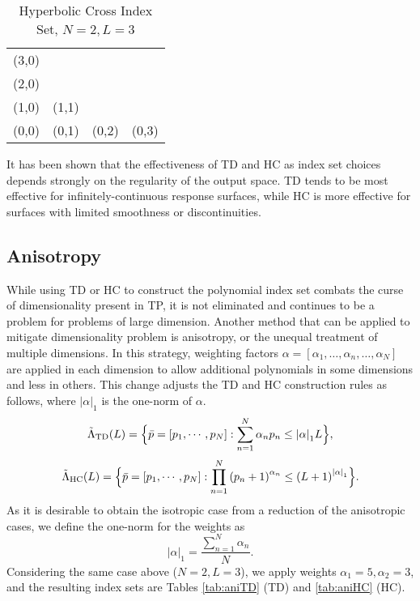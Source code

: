 \begin{table}[h]
  \centering
  \begin{tabular}{c c c c}
    (3,0) &       &       &       \\
    (2,0) &       &       &       \\
    (1,0) & (1,1) &       &       \\
    (0,0) & (0,1) & (0,2) & (0,3)
  \end{tabular}
  \caption{Hyperbolic Cross Index Set, $N=2,L=3$}
  \label{tab:TD}
\end{table}

It has been shown that the effectiveness of TD and HC as index set choices depends strongly on the regularity
of the output space\cite{hctd}.  TD tends to be most effective for infinitely-continuous response surfaces,
while HC is more effective for surfaces with limited smoothness or discontinuities.

\subsection{Anisotropy}
While using TD or HC to construct the polynomial index set combats the curse of dimensionality present in TP,
it is not eliminated and continues to be a problem for problems of large dimension.  Another method that can
be applied to mitigate dimensionality problem is anisotropy, or the unequal treatment of multiple dimensions.
In this strategy, weighting factors $\alpha=[\alpha_1,\ldots,\alpha_n,\ldots,\alpha_N]$ are applied in each
dimension to allow additional polynomials in some dimensions and less in others.  This change adjusts the TD
and HC construction rules as follows, where $|\alpha|_1$ is the one-norm of $\alpha$.
\begin{equation}
  \tilde\Lambda_\text{TD}(L)=\Big\{\bar p=[p_1,\cdots,p_N]:\sum_{n=1}^N \alpha_n p_n \leq \qty|\mathbf{\alpha}|_1 L
\Big\},
\end{equation}
\begin{equation}
  \tilde\Lambda_\text{HC}(L)=\Big\{\bar p=[p_1,\cdots,p_N]:\prod_{n=1}^N \qty(p_n+1)^{\alpha_n} \leq
  \qty(L+1)^{\qty|\mathbf{\alpha}|_1} \Big\}.
\end{equation}
As it is desirable to obtain the isotropic case from a reduction of the anisotropic cases, we define the
one-norm for the weights as
\begin{equation}
  |\alpha|_1 = \frac{\sum_{n=1}^N \alpha_n}{N}.
\end{equation}
Considering the same case above ($N=2,L=3$), we apply weights $\alpha_1=5,\alpha_2=3$, and the resulting index
sets are Tables \ref{tab:aniTD} (TD) and \ref{tab:aniHC} (HC).

